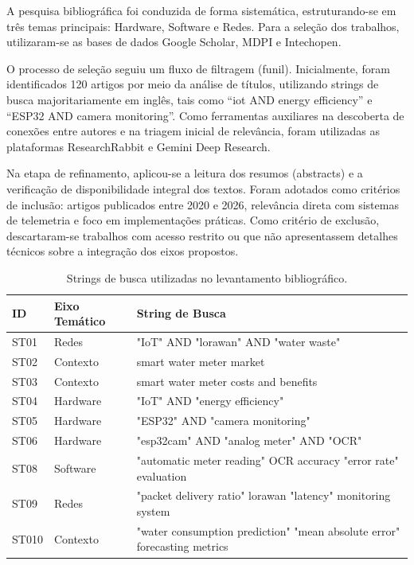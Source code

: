 
A pesquisa bibliográfica foi conduzida de forma sistemática, estruturando-se em três temas principais: Hardware, Software e Redes. Para a seleção dos trabalhos, utilizaram-se as bases de dados Google Scholar, MDPI e Intechopen.

O processo de seleção seguiu um fluxo de filtragem (funil). Inicialmente, foram identificados 120 artigos por meio da análise de títulos, utilizando strings de busca majoritariamente em inglês, tais como ``iot AND energy efficiency'' e ``ESP32 AND camera monitoring''. Como ferramentas auxiliares na descoberta de conexões entre autores e na triagem inicial de relevância, foram utilizadas as plataformas ResearchRabbit e Gemini Deep Research.

Na etapa de refinamento, aplicou-se a leitura dos resumos (abstracts) e a verificação de disponibilidade integral dos textos. Foram adotados como critérios de inclusão: artigos publicados entre 2020 e 2026, relevância direta com sistemas de telemetria e foco em implementações práticas. Como critério de exclusão, descartaram-se trabalhos com acesso restrito ou que não apresentassem detalhes técnicos sobre a integração dos eixos propostos.

\begin{table}[H]
\centering
\caption{Strings de busca utilizadas no levantamento bibliográfico.}
\label{tab:strings_busca}
\begin{tabular}{@{}lll@{}}
\toprule
\textbf{ID} & \textbf{Eixo Temático} & \textbf{String de Busca} \\ \midrule
ST01 & Redes & "IoT" AND "\gls{lorawan}" AND "water waste" \\
ST02 & Contexto & smart water meter market \\
ST03 & Contexto & smart water meter costs and benefits \\
ST04 & Hardware & "IoT" AND "energy efficiency" \\
ST05 & Hardware & "ESP32" AND "camera monitoring" \\
ST06 & Hardware & "\gls{esp32cam}" AND "analog meter" AND "OCR" \\
ST08 & Software & "automatic meter reading" OCR accuracy "error rate" evaluation \\
ST09 & Redes & "packet delivery ratio" \gls{lorawan} "latency" monitoring system \\
ST010 & Contexto & "water consumption prediction" "mean absolute error" forecasting metrics \\ \bottomrule
\end{tabular}
\end{table}
